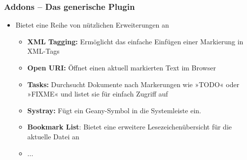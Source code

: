 \begin{frame}
    \frametitle{Addons -- Das generische Plugin}
    \begin{block}{}
        \begin{itemize}
            \item Bietet eine Reihe von nützlichen Erweiterungen an
            \begin{itemize}
                \item \textbf{XML Tagging:} Ermöglicht das einfache Einfügen
                      einer Markierung in XML-Tags
                \item \textbf{Open URI:} Öffnet einen aktuell markierten
                      Text im Browser
                \item \textbf{Tasks:} Durchsucht Dokumente nach Markerungen
                      wie »TODO« oder »FIXME« und listet sie für einfach
                      Zugriff auf
                \item \textbf{Systray:} Fügt ein Geany-Symbol in die
                      Systemleiste ein.
                \item \textbf{Bookmark List}: Bietet eine erweitere
                      Lesezeichenübersicht für die aktuelle Datei an
                \item ...
            \end{itemize}
        \end{itemize}
    \end{block}
\end{frame}
